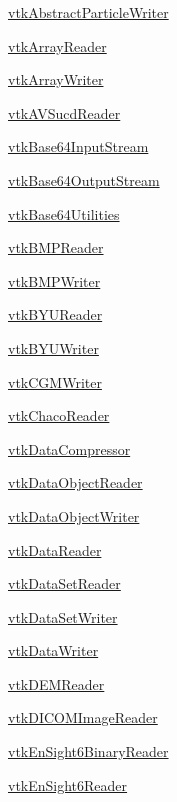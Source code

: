 
\begin{DoxyItemize}
\item \hyperlink{vtkio_vtkabstractparticlewriter}{vtk\-Abstract\-Particle\-Writer}  
\item \hyperlink{vtkio_vtkarrayreader}{vtk\-Array\-Reader}  
\item \hyperlink{vtkio_vtkarraywriter}{vtk\-Array\-Writer}  
\item \hyperlink{vtkio_vtkavsucdreader}{vtk\-A\-V\-Sucd\-Reader}  
\item \hyperlink{vtkio_vtkbase64inputstream}{vtk\-Base64\-Input\-Stream}  
\item \hyperlink{vtkio_vtkbase64outputstream}{vtk\-Base64\-Output\-Stream}  
\item \hyperlink{vtkio_vtkbase64utilities}{vtk\-Base64\-Utilities}  
\item \hyperlink{vtkio_vtkbmpreader}{vtk\-B\-M\-P\-Reader}  
\item \hyperlink{vtkio_vtkbmpwriter}{vtk\-B\-M\-P\-Writer}  
\item \hyperlink{vtkio_vtkbyureader}{vtk\-B\-Y\-U\-Reader}  
\item \hyperlink{vtkio_vtkbyuwriter}{vtk\-B\-Y\-U\-Writer}  
\item \hyperlink{vtkio_vtkcgmwriter}{vtk\-C\-G\-M\-Writer}  
\item \hyperlink{vtkio_vtkchacoreader}{vtk\-Chaco\-Reader}  
\item \hyperlink{vtkio_vtkdatacompressor}{vtk\-Data\-Compressor}  
\item \hyperlink{vtkio_vtkdataobjectreader}{vtk\-Data\-Object\-Reader}  
\item \hyperlink{vtkio_vtkdataobjectwriter}{vtk\-Data\-Object\-Writer}  
\item \hyperlink{vtkio_vtkdatareader}{vtk\-Data\-Reader}  
\item \hyperlink{vtkio_vtkdatasetreader}{vtk\-Data\-Set\-Reader}  
\item \hyperlink{vtkio_vtkdatasetwriter}{vtk\-Data\-Set\-Writer}  
\item \hyperlink{vtkio_vtkdatawriter}{vtk\-Data\-Writer}  
\item \hyperlink{vtkio_vtkdemreader}{vtk\-D\-E\-M\-Reader}  
\item \hyperlink{vtkio_vtkdicomimagereader}{vtk\-D\-I\-C\-O\-M\-Image\-Reader}  
\item \hyperlink{vtkio_vtkensight6binaryreader}{vtk\-En\-Sight6\-Binary\-Reader}  
\item \hyperlink{vtkio_vtkensight6reader}{vtk\-En\-Sight6\-Reader}  

\end{DoxyItemize}

